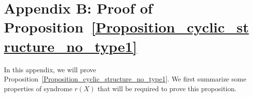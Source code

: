 \documentclass[10pt,journal]{IEEEtran}
\begin{document}
\section*{Appendix B: Proof of Proposition~\ref{Proposition_cyclic_structure_no_type1}}
%  
In this appendix, we will prove Proposition~\ref{Proposition_cyclic_structure_no_type1}.
We first summarize some properties of syndrome $r(X)$ that will be required to prove this proposition.
\end{document}
